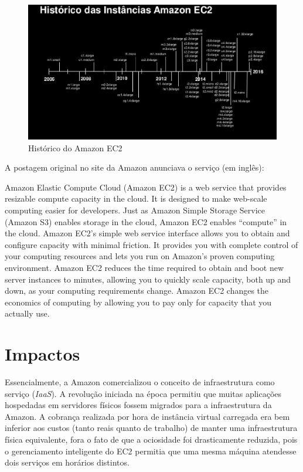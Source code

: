 \begin{figure}[h!]
  \centering
  \includegraphics[scale=0.60]{imagens/ec2_history.eps}
  \caption{Histórico do Amazon EC2\cite{ec2history}}
\end{figure}

A postagem original no site da Amazon anunciava o serviço (em inglês)\cite{postamazonec2}:

\begin{citacaoLonga}
  Amazon Elastic Compute Cloud (Amazon EC2) is a web service that provides resizable compute capacity in the cloud. It is designed to make web-scale computing easier for developers. Just as Amazon Simple Storage Service (Amazon S3) enables storage in the cloud, Amazon EC2 enables “compute” in the cloud. Amazon EC2’s simple web service interface allows you to obtain and configure capacity with minimal friction. It provides you with complete control of your computing resources and lets you run on Amazon’s proven computing environment. Amazon EC2 reduces the time required to obtain and boot new server instances to minutes, allowing you to quickly scale capacity, both up and down, as your computing requirements change. Amazon EC2 changes the economics of computing by allowing you to pay only for capacity that you actually use.
\end{citacaoLonga}

\section{Impactos}

Essencialmente, a Amazon comercializou o conceito de infraestrutura como serviço (\textit{IaaS}). A revolução iniciada na época permitiu que muitas aplicações hospedadas em servidores físicos fossem migrados para a infraestrutura da Amazon. A cobrança realizada por hora de instância virtual carregada era bem inferior aos custos (tanto reais quanto de trabalho) de manter uma infraestrutura física equivalente, fora o fato de que a ociosidade foi drasticamente reduzida, pois o gerenciamento inteligente do EC2 permitia que uma mesma máquina atendesse dois serviços em horários distintos.

